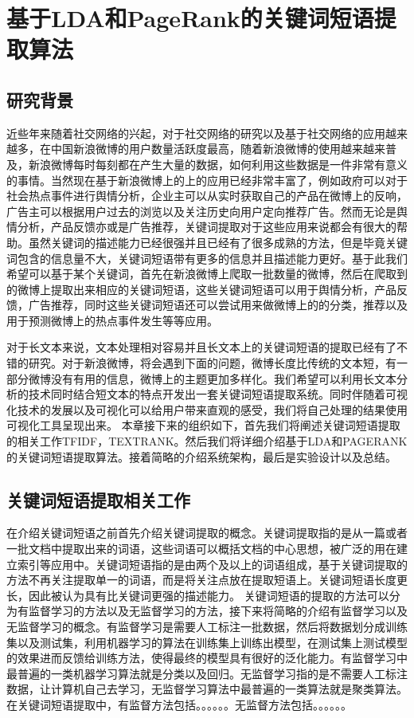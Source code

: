 \documentclass[master]{njuthesis}
\begin{document}
\chapter{基于LDA和PageRank的关键词短语提取算法}\label{chapter_smallworld}
\section{研究背景}

    近些年来随着社交网络的兴起，对于社交网络的研究以及基于社交网络的应用越来越多，在中国新浪微博的用户数量活跃度最高，随着新浪微博的使用越来越来普及，新浪微博每时每刻都在产生大量的数据，如何利用这些数据是一件非常有意义的事情。当然现在基于新浪微博上的上的应用已经非常丰富了，例如政府可以对于社会热点事件进行舆情分析，企业主可以从实时获取自己的产品在微博上的反响，广告主可以根据用户过去的浏览以及关注历史向用户定向推荐广告。然而无论是舆情分析，产品反馈亦或是广告推荐，关键词提取对于这些应用来说都会有很大的帮助。虽然关键词的描述能力已经很强并且已经有了很多成熟的方法，但是毕竟关键词包含的信息量不大，关键词短语带有更多的信息并且描述能力更好。基于此我们希望可以基于某个关键词，首先在新浪微博上爬取一批数量的微博，然后在爬取到的微博上提取出来相应的关键词短语，这些关键词短语可以用于舆情分析，产品反馈，广告推荐，同时这些关键词短语还可以尝试用来做微博上的的分类，推荐以及用于预测微博上的热点事件发生等等应用。

    对于长文本来说，文本处理相对容易并且长文本上的关键词短语的提取已经有了不错的研究。对于新浪微博，将会遇到下面的问题，微博长度比传统的文本短，有一部分微博没有有用的信息，微博上的主题更加多样化。我们希望可以利用长文本分析的技术同时结合短文本的特点开发出一套关键词短语提取系统。同时伴随着可视化技术的发展以及可视化可以给用户带来直观的感受，我们将自己处理的结果使用可视化工具呈现出来。
    本章接下来的组织如下，首先我们将阐述关键词短语提取的相关工作TFIDF，TEXTRANK。然后我们将详细介绍基于LDA和PAGERANK的关键词短语提取算法。接着简略的介绍系统架构，最后是实验设计以及总结。

\section{关键词短语提取相关工作}

    在介绍关键词短语之前首先介绍关键词提取的概念。关键词提取指的是从一篇或者一批文档中提取出来的词语，这些词语可以概括文档的中心思想，被广泛的用在建立索引等应用中。关键词短语指的是由两个及以上的词语组成，基于关键词提取的方法不再关注提取单一的词语，而是将关注点放在提取短语上。关键词短语长度更长，因此被认为具有比关键词更强的描述能力。
    关键词短语的提取的方法可以分为有监督学习的方法以及无监督学习的方法，接下来将简略的介绍有监督学习以及无监督学习的概念。有监督学习是需要人工标注一批数据，然后将数据划分成训练集以及测试集，利用机器学习的算法在训练集上训练出模型，在测试集上测试模型的效果进而反馈给训练方法，使得最终的模型具有很好的泛化能力。有监督学习中最普遍的一类机器学习算法就是分类以及回归。无监督学习指的是不需要人工标注数据，让计算机自己去学习，无监督学习算法中最普遍的一类算法就是聚类算法。在关键词短语提取中，有监督方法包括。。。。。。无监督方法包括。。。。。。
\end{document}
